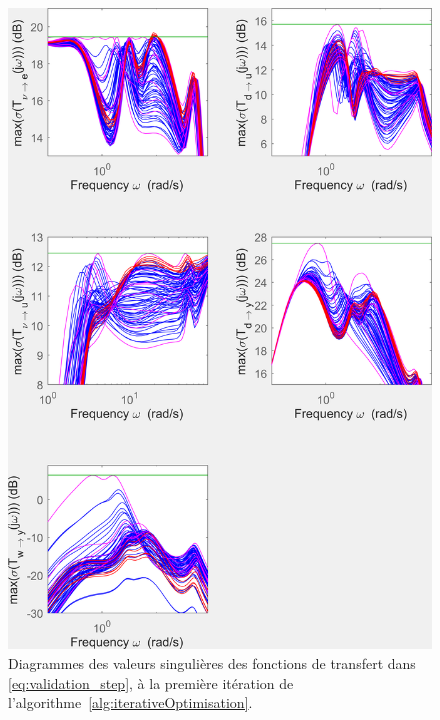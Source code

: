\begin{figure}[ht!]
    \centering
    \includegraphics[trim=0cm 0cm 0cm 0cm,clip,width=0.8\columnwidth]{figures/transferts_tcst.png}
    \caption{Diagrammes des valeurs singulières des fonctions de transfert dans \eqref{eq:validation_step}, à la première itération de l'algorithme~\ref{alg:iterativeOptimisation}.}
    \label{fig:transferts_tcst}
\end{figure}


